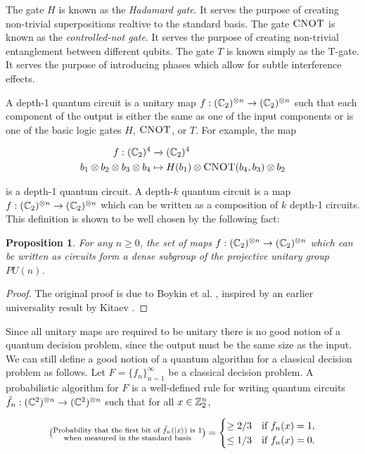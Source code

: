 \documentclass{article}
\newtheorem{proposition}{Proposition}[section]
\theoremstyle{definition}
\numberwithin{figure}{section}
\begin{document}
The gate $H$ is known as the \textit{Hadamard gate}. It serves the purpose of creating non-trivial superpositions realtive to the standard basis. The gate $\textsc{CNOT}$ is known as the \textit{controlled-not gate}. It serves the purpose of creating non-trivial entanglement between different qubits. The gate $T$ is known simply as the T-gate. It serves the purpose of introducing phases which allow for subtle interference effects.

A depth-1 quantum circuit is a unitary map $f:(\mathbb{C}_2)^{\otimes n}\to (\mathbb{C}_2)^{\otimes n}$ such that each component of the output is either the same as one of the input components or is one of the basic logic gates $H$, $\textsc{CNOT}$, or $T$. For example, the map

\begin{align*}
f: (\mathbb{C}_2)^4&\xrightarrow{} (\mathbb{C}_2)^4\\
b_1\otimes b_2\otimes b_3\otimes b_4 & \mapsto H(b_1) \otimes \textsc{CNOT}(b_4,b_3) \otimes b_2
\end{align*}

is a depth-1 quantum circuit.  A depth-$k$ quantum circuit is a map $f:(\mathbb{C}_2)^{\otimes n}\to (\mathbb{C}_2)^{\otimes n}$ which can be written as a composition of $k$ depth-1 circuits. This definition is shown to be well chosen by the following fact:

\begin{proposition} For any $n\geq 0$, the set of maps $f:(\mathbb{C}_2)^{\otimes n}\to (\mathbb{C}_2)^{\otimes n}$ which can be written as circuits form a dense subgroup of the projective unitary group $PU(n)$.
\end{proposition}
\begin{proof} The original proof is due to Boykin et al. \cite{boykin1999universal}, inspired by an earlier universality result by Kitaev \cite{kitaev1997quantum}.
\end{proof}

Since all unitary maps are required to be unitary there is no good notion of a quantum decision problem, since the output must be the same size as the input. We can still define a good notion of a quantum algorithm for a classical decision problem as follows. Let $F=\{f_n\}_{n=1}^{\infty}$ be a classical decision problem. A probabilistic algorithm for $F$ is a well-defined rule for writing quantum circuits $\tilde{f}_n: (\mathbb{C}^2)^{\otimes n}\to (\mathbb{C}^2)^{\otimes n}$ such that for all $x\in \mathbb{Z}_2^n$,

$$(\substack{\text{Probability that the first bit of $\tilde{f}_n(\ket{x})$ is $1$}\\ \text{when measured in the standard basis}} )=
\begin{cases}
\geq 2/3 & \text{if } f_n(x)=1,\\
\leq 1/3 & \text{if } f_n(x)=0.\\
\end{cases}$$
\end{document}

